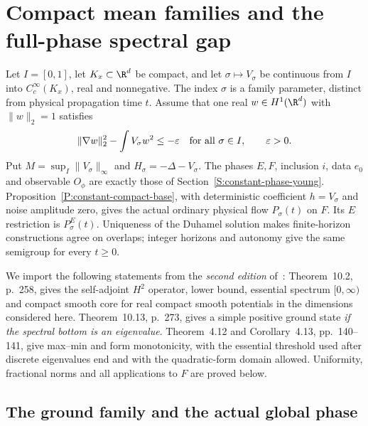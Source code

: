 \section{Compact mean families and the full-phase spectral gap}
\label{S:compact-mean-family}

Let $I=[0,1]$, let $K_x\subset\R^d$ be compact, and let
$\sigma\mapsto V_\sigma$ be continuous from $I$ into
$C_c^\infty(K_x)$, real and nonnegative. The index $\sigma$ is a
family parameter, distinct from physical propagation time $t$.
Assume that one real $w\in H^1(\R^d)$ with $\|w\|_2=1$ satisfies
\begin{equation}\label{E:compact-common-trial}
  \|\nabla w\|_2^2-\int V_\sigma w^2\le-\varepsilon
  \quad\hbox{for all }\sigma\in I,\qquad \varepsilon>0.
\end{equation}
Put $M=\sup_I\|V_\sigma\|_\infty$ and $H_\sigma=-\Delta-V_\sigma$.
The phases $E,F$, inclusion $i$, data $e_0$ and observable $O_\phi$
are exactly those of Section~\ref{S:constant-phase-young}.
Proposition~\ref{P:constant-compact-base}, with deterministic coefficient
$h=V_\sigma$ and noise amplitude zero, gives the actual ordinary physical
flow $P_\sigma(t)$ on $F$. Its $E$ restriction is $P_\sigma^E(t)$.
Uniqueness of the Duhamel solution makes finite-horizon constructions
agree on overlaps; integer horizons and autonomy give the same
semigroup for every $t\ge0$.

We import the following statements from the \emph{second edition}
of~\cite{teschl:14:mathematical}: Theorem~10.2, p.~258, gives the
self-adjoint $H^2$ operator, lower bound, essential spectrum $[0,\infty)$
and compact smooth core for real compact smooth potentials in the
dimensions considered here. Theorem~10.13, p.~273, gives a simple
positive ground state \emph{if the spectral bottom is an eigenvalue}.
Theorem~4.12 and Corollary~4.13, pp.~140--141, give max--min and
form monotonicity, with the essential threshold used after discrete
eigenvalues end and with the quadratic-form domain allowed.
Uniformity, fractional norms and all applications to $F$ are proved below.

\subsection{The ground family and the actual global phase}

